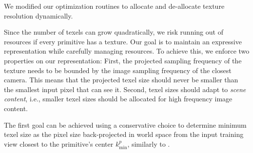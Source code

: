 We modified our optimization routines to allocate and de-allocate texture resolution dynamically. %


Since the number of texels can grow quadratically, we risk running out of resources if every primitive  has a texture. Our goal is to maintain an expressive representation while carefully managing resources. To achieve this, we enforce two properties on our representation: First, the projected sampling frequency of the texture needs to be bounded by the image sampling frequency of the closest camera. This means that the projected texel size should never be smaller than the smallest input pixel that can see it. Second, texel sizes should adapt to \emph{scene content}, i.e., smaller texel sizes should be allocated for high frequency image content.

The first goal can be achieved using a conservative choice to determine minimum texel size as the pixel size back-projected in world space from the input training view closest to the primitive's center $k^p_{\mathrm{min}}$, similarly to \cite{reduced3dgs}.



